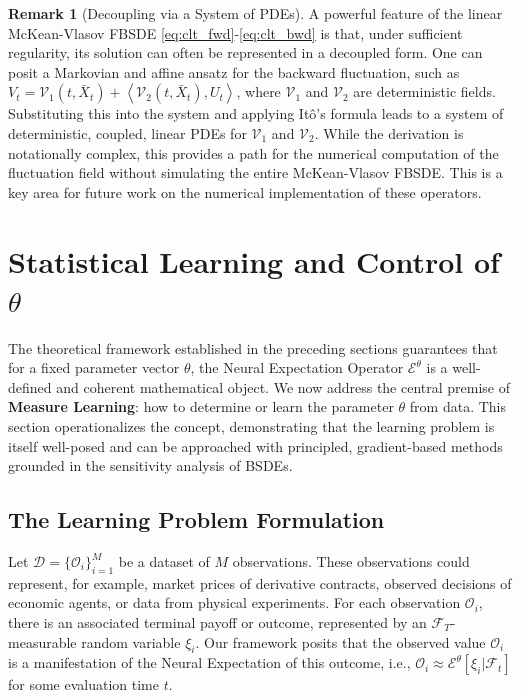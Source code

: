 \documentclass[qian]{imsart}
\newcommand{\Fcal}{\mathcal{F}}
\newcommand{\cEneutheta}{\mathcal{E}^{\theta}}
\newcommand{\scpr}[2]{\left\langle #1, #2 \right\rangle}
\theoremstyle{plain}
\theoremstyle{definition}
\newtheorem{remark}[theorem]{Remark}
\begin{document}
\begin{remark}[Decoupling via a System of PDEs]
\label{rem:decoupling_pde}
A powerful feature of the linear McKean-Vlasov FBSDE \eqref{eq:clt_fwd}-\eqref{eq:clt_bwd} is that, under sufficient regularity, its solution can often be represented in a decoupled form. One can posit a Markovian and affine ansatz for the backward fluctuation, such as $V_t = \mathcal{V}_1(t, \bar{X}_t) + \scpr{\mathcal{V}_2(t, \bar{X}_t)}{U_t}$, where $\mathcal{V}_1$ and $\mathcal{V}_2$ are deterministic fields. Substituting this into the system and applying Itô's formula leads to a system of deterministic, coupled, linear PDEs for $\mathcal{V}_1$ and $\mathcal{V}_2$. While the derivation is notationally complex, this provides a path for the numerical computation of the fluctuation field without simulating the entire McKean-Vlasov FBSDE. This is a key area for future work on the numerical implementation of these operators.
\end{remark}

\section{Statistical Learning and Control of \texorpdfstring{$\theta$}{theta}}
\label{sec:learning_theta}

The theoretical framework established in the preceding sections guarantees that for a fixed parameter vector $\theta$, the Neural Expectation Operator $\cEneutheta$ is a well-defined and coherent mathematical object. We now address the central premise of \textbf{Measure Learning}: how to determine or learn the parameter $\theta$ from data. This section operationalizes the concept, demonstrating that the learning problem is itself well-posed and can be approached with principled, gradient-based methods grounded in the sensitivity analysis of BSDEs.

\subsection{The Learning Problem Formulation}

Let $\mathcal{D} = \{ \mathcal{O}_i \}_{i=1}^M$ be a dataset of $M$ observations. These observations could represent, for example, market prices of derivative contracts, observed decisions of economic agents, or data from physical experiments. For each observation $\mathcal{O}_i$, there is an associated terminal payoff or outcome, represented by an $\Fcal_T$-measurable random variable $\xi_i$. Our framework posits that the observed value $\mathcal{O}_i$ is a manifestation of the Neural Expectation of this outcome, i.e., $\mathcal{O}_i \approx \cEneutheta[\xi_i | \Fcal_t]$ for some evaluation time $t$.
\end{document}
